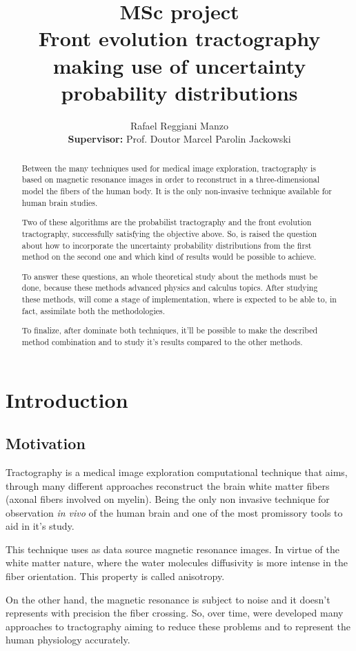 \documentclass[a4paper,11pt]{report}
\title{MSc project\\
       \textbf{Front evolution tractography making use of uncertainty probability distributions}}
\author{Rafael Reggiani Manzo\\
        \textbf{Supervisor:} Prof. Doutor Marcel Parolin Jackowski}
\begin{document}
\maketitle
\tableofcontents

\begin{abstract}
Between the many techniques used for medical image exploration, tractography is based on magnetic resonance images in order to reconstruct in a three-dimensional model the fibers of the human body. It is the only non-invasive technique available for human brain studies.

Two of these algorithms are the probabilist tractography and the front evolution tractography, successfully satisfying the objective above. So, is raised the question about how to incorporate the uncertainty probability distributions from the first method on the second one and which kind of results would be possible to achieve.

To answer these questions, an whole theoretical study about the methods must be done, because these methods advanced physics and calculus topics. After studying these methods, will come a stage of implementation, where is expected to be able to, in fact, assimilate both the methodologies.

To finalize, after dominate both techniques, it'll be possible to make the described method combination and to study it's results compared to the other methods.
\end{abstract}

\chapter{Introduction}
  \section{Motivation}
  Tractography is a medical image exploration computational technique that aims, through many different approaches reconstruct the brain white matter fibers (axonal fibers involved on myelin). Being the only non invasive technique for observation \textit{in vivo} of the human brain and one of the most promissory tools to aid in it's study.

  This technique uses as data source magnetic resonance images. In virtue of the white matter nature, where the water molecules diffusivity is more intense in the fiber orientation. This property is called anisotropy.

  On the other hand, the magnetic resonance is subject to noise and it doesn't represents with precision the fiber crossing. So, over time, were developed many approaches to tractography aiming to reduce these problems and to represent the human physiology accurately.
\end{document}
